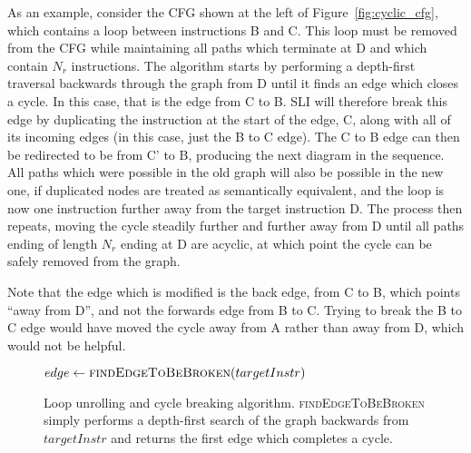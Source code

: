 As an example, consider the CFG shown at the left of
Figure~\ref{fig:cyclic_cfg}, which contains a loop between
instructions B and C.  This loop must be removed from the CFG while
maintaining all paths which terminate at D and which contain $N_r$
instructions.  The algorithm starts by performing a depth-first
traversal backwards through the graph from D until it finds an edge
which closes a cycle.  In this case, that is the edge from C to B.
SLI will therefore break this edge by duplicating the instruction at
the start of the edge, C, along with all of its incoming edges (in
this case, just the B to C edge).  The C to B edge can then be
redirected to be from C' to B, producing the next diagram in the
sequence.  All paths which were possible in the old graph will also be
possible in the new one, if duplicated nodes are treated as
semantically equivalent, and the loop is now one instruction further
away from the target instruction D.  The process then repeats, moving
the cycle steadily further and further away from D until all paths
ending of length $N_r$ ending at D are acyclic, at which point the
cycle can be safely removed from the graph.

Note that the edge which is modified is the back edge, from C to B,
which points ``away from D'', and not the forwards edge from B to C.
Trying to break the B to C edge would have moved the cycle away from A
rather than away from D, which would not be helpful.

\begin{figure}
\begin{algorithmic}[1]
     \State $edge \gets \textsc{findEdgeToBeBroken}(targetInstr)$
     \Else
        \EndFor
     \EndIf
  \EndWhile
\end{algorithmic}
\caption{Loop unrolling and cycle breaking algorithm.
  \textsc{findEdgeToBeBroken} simply performs a depth-first search of
  the graph backwards from $targetInstr$ and returns the first edge
  which completes a cycle.}
\label{fig:derive:read:unroll_cycle_break}
\end{figure}

